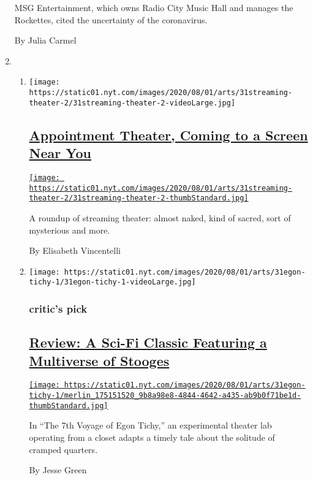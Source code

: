 \begin{enumerate}
  MSG Entertainment, which owns Radio City Music Hall and manages the
  Rockettes, cited the uncertainty of the coronavirus.

  By Julia Carmel
\item
  \begin{enumerate}
  \def\labelenumii{\arabic{enumii}.}
  \item
    \texttt{[image: https://static01.nyt.com/images/2020/08/01/arts/31streaming-theater-2/31streaming-theater-2-videoLarge.jpg]}

    \hypertarget{appointment-theater-coming-to-a-screen-near-you}{%
    \subsection{\texorpdfstring{\href{/2020/07/30/theater/streaming-theater-online.html}{Appointment
    Theater, Coming to a Screen Near
    You}}{Appointment Theater, Coming to a Screen Near You}}\label{appointment-theater-coming-to-a-screen-near-you}}

    \href{/2020/07/30/theater/streaming-theater-online.html}{\texttt{[image: https://static01.nyt.com/images/2020/08/01/arts/31streaming-theater-2/31streaming-theater-2-thumbStandard.jpg]}}

    A roundup of streaming theater: almost naked, kind of sacred, sort
    of mysterious and more.

    By Elisabeth Vincentelli
  \item
    \texttt{[image: https://static01.nyt.com/images/2020/08/01/arts/31egon-tichy-1/31egon-tichy-1-videoLarge.jpg]}

    \hypertarget{critics-pick}{%
    \subsubsection{critic's pick}\label{critics-pick}}

    \hypertarget{review-a-sci-fi-classic-featuring-a-multiverse-of-stooges}{%
    \subsection{\texorpdfstring{\href{/2020/07/31/theater/the-7th-voyage-of-egon-tichy-review.html}{Review:
    A Sci-Fi Classic Featuring a Multiverse of
    Stooges}}{Review: A Sci-Fi Classic Featuring a Multiverse of Stooges}}\label{review-a-sci-fi-classic-featuring-a-multiverse-of-stooges}}

    \href{/2020/07/31/theater/the-7th-voyage-of-egon-tichy-review.html}{\texttt{[image: https://static01.nyt.com/images/2020/08/01/arts/31egon-tichy-1/merlin\_175151520\_9b8a98e8-4844-4642-a435-ab9b0f71be1d-thumbStandard.jpg]}}

    In ``The 7th Voyage of Egon Tichy,'' an experimental theater lab
    operating from a closet adapts a timely tale about the solitude of
    cramped quarters.

    By Jesse Green
  \end{enumerate}
\end{enumerate}

